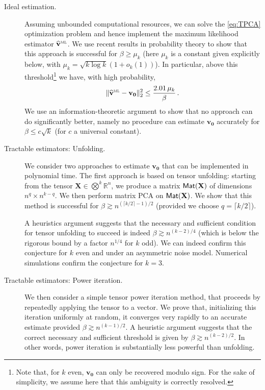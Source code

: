 \documentclass[11pt]{article}
\theoremstyle{definition}
\def\sML{\mbox{\tiny\sc ML}}
\def\reals{\mathbb{R}}
\def\hbv{\mathbf{\widehat{v}}}
\def\bvz{\mathbf{v_0}}
\def\bX{\mathbf{X}}
\def\M{{\sf Mat}}
\begin{document}
\begin{description}
%
\item[Ideal estimation.] Assuming unbounded computational
  resources, we can solve the  \ref{eq:TPCA} optimization problem and
  hence implement the maximum likelihood estimator $\hbv^{\sML}$.
We use recent results in probability theory to show that this approach
is successful for $\beta\ge \mu_k$ (here $\mu_k$ is a constant given
explicitly below, with $\mu_k = \sqrt{k\log k}(1+o_k(1))$). In particular, above
this threshold\footnote{Note that, for $k$ even,  $\bvz$
  can only be recovered modulo sign. For the sake of simplicity, we
  assume here that this ambiguity is correctly resolved.} we have, with high probability,
%
\begin{align}
%
\|\hbv^{\sML}-\bvz\|_2^2 \le \frac{2.01\, \mu_k}{\beta}\, .
%
\end{align}
%
We use an information-theoretic argument to show that no approach can
do significantly better, namely no procedure can estimate $\bvz$
accurately for $\beta\le c \sqrt{k}$ (for $c$ a universal constant).
%
\item[Tractable estimators: Unfolding.] We consider two approaches to estimate
  $\bvz$ that can be implemented in polynomial time.  The first approach is
  based on tensor unfolding: starting from the tensor
  $\bX\in\bigotimes^k\reals^n$, we produce a matrix $\M(\bX)$ of
  dimensions $n^q\times n^{k-q}$. We then perform matrix PCA on $\M(\bX)$. We show that this
  method is successful for $\beta\gtrsim n^{(\lceil
    k/2\rceil-1)/2}$ (provided we choose $q= \lceil k/2\rceil$).

A heuristics argument suggests that the necessary and sufficient condition for tensor
unfolding to succeed is indeed  $\beta\gtrsim n^{(k-2)/4}$ (which is
below the rigorous bound by a factor $n^{1/4}$ for $k$ odd). We can indeed
confirm this conjecture for $k$ even and under an asymmetric noise
model.
Numerical simulations confirm the conjecture for $k=3$.

\item[Tractable estimators: Power iteration.]
We then consider a simple tensor power iteration method, that proceeds
by repeatedly applying the tensor to a vector. 
We prove that, initializing this iteration uniformly at random, it
converges very rapidly to an accurate estimate provided $\beta\gtrsim
n^{(k-1)/2}$.
A heuristic argument suggests that the correct necessary and
sufficient threshold is given by $\beta\gtrsim
n^{(k-2)/2}$.
In other words, power iteration is substantially less powerful than 
unfolding.


\end{description}
\end{document}
